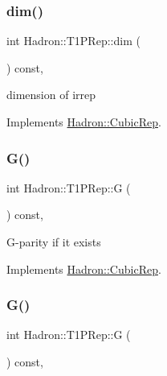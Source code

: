 \subsubsection{\texorpdfstring{dim()}{dim()}\hspace{0.1cm}{\footnotesize\ttfamily [3/3]}}
{\footnotesize\ttfamily int Hadron\+::\+T1\+P\+Rep\+::dim (\begin{DoxyParamCaption}{ }\end{DoxyParamCaption}) const\hspace{0.3cm}{\ttfamily [inline]}, {\ttfamily [virtual]}}

dimension of irrep 

Implements \mbox{\hyperlink{structHadron_1_1CubicRep_ac178d14064f037a66af4b9fb4b312d51}{Hadron\+::\+Cubic\+Rep}}.

\mbox{\label{structHadron_1_1T1PRep_ab9f492c9418a9100a8c3cef867831758}} 
\subsubsection{\texorpdfstring{G()}{G()}\hspace{0.1cm}{\footnotesize\ttfamily [1/3]}}
{\footnotesize\ttfamily int Hadron\+::\+T1\+P\+Rep\+::G (\begin{DoxyParamCaption}{ }\end{DoxyParamCaption}) const\hspace{0.3cm}{\ttfamily [inline]}, {\ttfamily [virtual]}}

G-\/parity if it exists 

Implements \mbox{\hyperlink{structHadron_1_1CubicRep_a52104e43266d1614c00bbd1c3b395458}{Hadron\+::\+Cubic\+Rep}}.

\mbox{\label{structHadron_1_1T1PRep_ab9f492c9418a9100a8c3cef867831758}} 
\subsubsection{\texorpdfstring{G()}{G()}\hspace{0.1cm}{\footnotesize\ttfamily [2/3]}}
{\footnotesize\ttfamily int Hadron\+::\+T1\+P\+Rep\+::G (\begin{DoxyParamCaption}{ }\end{DoxyParamCaption}) const\hspace{0.3cm}{\ttfamily [inline]}, {\ttfamily [virtual]}}

